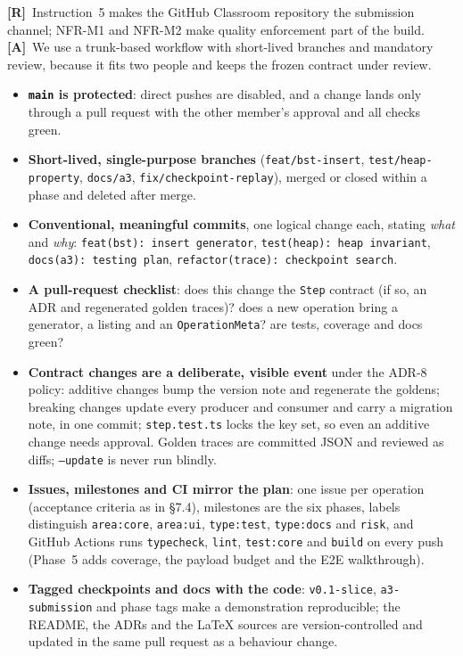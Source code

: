 \documentclass[11pt,a4paper]{article}
\newcommand{\R}{\textcolor{reqc}{\textbf{[R]}}}     %
\newcommand{\A}{\textcolor{asmc}{\textbf{[A]}}}     %
\newcommand{\ct}[1]{\texttt{#1}}
\begin{document}
\R\ Instruction~5 makes the GitHub Classroom repository the submission channel; NFR-M1 and
NFR-M2 make quality enforcement part of the build. \A\ We use a trunk-based workflow with
short-lived branches and mandatory review, because it fits two people and keeps the frozen
contract under review.

\begin{itemize}[leftmargin=1.4em,topsep=2pt,itemsep=1pt,before=\raggedright]
  \item \textbf{\ct{main} is protected}: direct pushes are disabled, and a change lands only
        through a pull request with the other member's approval and all checks green.
  \item \textbf{Short-lived, single-purpose branches} (\ct{feat/bst-insert},
        \ct{test/heap-property}, \ct{docs/a3}, \ct{fix/checkpoint-replay}), merged or closed
        within a phase and deleted after merge.
  \item \textbf{Conventional, meaningful commits}, one logical change each, stating \emph{what}
        and \emph{why}: \ct{feat(bst): insert generator}, \ct{test(heap): heap invariant},
        \ct{docs(a3): testing plan}, \ct{refactor(trace): checkpoint search}.
  \item \textbf{A pull-request checklist}: does this change the \ct{Step} contract (if so, an
        ADR and regenerated golden traces)? does a new operation bring a generator, a listing
        and an \ct{OperationMeta}? are tests, coverage and docs green?
  \item \textbf{Contract changes are a deliberate, visible event} under the ADR-8 policy:
        additive changes bump the version note and regenerate the goldens; breaking changes
        update every producer and consumer and carry a migration note, in one commit;
        \ct{step.test.ts} locks the key set, so even an additive change needs approval. Golden
        traces are committed JSON and reviewed as diffs; \ct{--update} is never run blindly.
  \item \textbf{Issues, milestones and CI mirror the plan}: one issue per operation (acceptance
        criteria as in \S7.4), milestones are the six phases, labels distinguish
        \ct{area:core}, \ct{area:ui}, \ct{type:test}, \ct{type:docs} and \ct{risk}, and GitHub
        Actions runs \ct{typecheck}, \ct{lint}, \ct{test:core} and \ct{build} on every push
        (Phase~5 adds coverage, the payload budget and the E2E walkthrough).
  \item \textbf{Tagged checkpoints and docs with the code}: \ct{v0.1-slice},
        \ct{a3-submission} and phase tags make a demonstration reproducible; the README, the
        ADRs and the \LaTeX{} sources are version-controlled and updated in the same pull
        request as a behaviour change.
\end{itemize}
\end{document}
